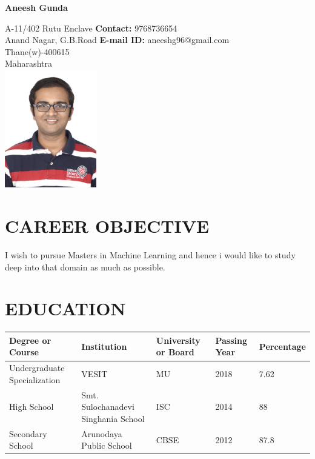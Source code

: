 \documentclass{article}
\newcommand{\name}[1]{
                \centerline{\Huge{#1}}
}
\begin{document}
\name{\textbf{Aneesh Gunda}}

\makebox[\linewidth]{\rule{\paperwidth}{2.4pt}}




 
\begin{flushleft}
                {A-11/402 Rutu Enclave} \noindent\hspace{245}\textbf{Contact:} 9768736654%
                \\{Anand Nagar, G.B.Road} \hfill \textbf{E-mail ID:} aneeshg96@gmail.com
                \\{Thane(w)-400615} 
                \\{Maharashtra}
                \\\hfill\includegraphics[width=4cm]{Aneesh}
\end{flushleft}





\section{CAREER OBJECTIVE}
{\selectfont
I wish to pursue Masters in Machine Learning and hence i would like to study deep into that domain as much as possible. 
}
\section{EDUCATION}

 
\setlength{\arrayrulewidth}{.1mm}
\setlength{\tabcolsep}{18pt}
\renewcommand{\arraystretch}{1.5}
 
\begin{tabular}{ |p{3cm}|p{3cm}|p{2cm}|p{2cm}|p{2cm}|  }
\hline

\hline
Degree or  Course & Institution & University or Board & Passing Year & Percentage\\
\hline
Undergraduate Specialization& VESIT& MU &2018& 7.62 \\
High School & Smt. Sulochanadevi Singhania School & ISC& 2014 &88\\
Secondary School & Arunodaya Public School & CBSE& 2012 & 87.8\\
\hline
\end{tabular}
\end{document}
